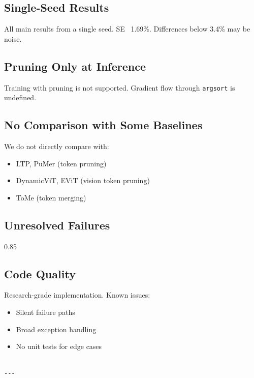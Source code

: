 \subsection{Single-Seed Results}

All main results from a single seed. SE ~1.69\%. Differences below 3.4\% 
may be noise.

\subsection{Pruning Only at Inference}

Training with pruning is not supported. Gradient flow through \texttt{argsort} 
is undefined.

\subsection{No Comparison with Some Baselines}

We do not directly compare with:

\begin{itemize}
\item LTP, PuMer (token pruning)
\item DynamicViT, EViT (vision token pruning)
\item ToMe (token merging)

\end{itemize}
\subsection{Unresolved Failures}

0.85

\subsection{Code Quality}

Research-grade implementation. Known issues:

\begin{itemize}
\item Silent failure paths
\item Broad exception handling
\item No unit tests for edge cases
\end{itemize}
\begin{lstlisting}

---
\end{lstlisting}


